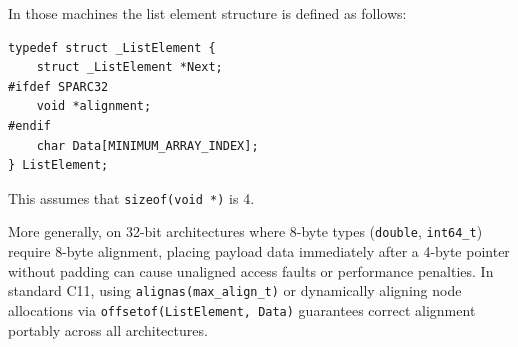 \documentclass[12pt,a4paper,openany]{memoir} %
\begin{document}
{{In those machines the list element structure is defined as follows:
\begin{verbatim}
typedef struct _ListElement {
    struct _ListElement *Next;
#ifdef SPARC32
    void *alignment;
#endif
    char Data[MINIMUM_ARRAY_INDEX];
} ListElement;
\end{verbatim}

This assumes that \verb,sizeof(void *), is 4. 

More generally, on 32-bit architectures where 8-byte types (\texttt{double}, \texttt{int64\_t}) require 8-byte alignment, placing payload data immediately after a 4-byte pointer without padding can cause unaligned access faults or performance penalties. In standard C11, using \texttt{alignas(max\_align\_t)} or dynamically aligning node allocations via \texttt{offsetof(ListElement, Data)} guarantees correct alignment portably across all architectures.

}}
\end{document}
